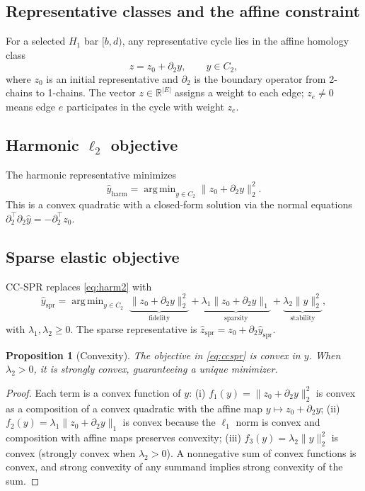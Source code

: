 \documentclass[11pt]{article}
\newtheorem{proposition}[theorem]{Proposition}
\DeclareMathOperator*{\argmin}{arg\,min}
\begin{document}
\subsection{Representative classes and the affine constraint}

For a selected $H_1$ bar $[b, d)$, any representative cycle lies in the affine homology class
\[
z = z_0 + \partial_2 y, \qquad y \in C_2,
\]
where $z_0$ is an initial representative and $\partial_2$ is the boundary operator from 2-chains to 1-chains.
The vector $z \in \mathbb{R}^{|E|}$ assigns a weight to each edge; $z_e \ne 0$ means edge $e$ participates in the cycle with weight $z_e$.

\subsection{Harmonic $\ell_2$ objective}

The harmonic representative minimizes
\begin{equation}\label{eq:harm2}
\hat{y}_{\mathrm{harm}} = \argmin_{y \in C_2} \| z_0 + \partial_2 y \|_2^2.
\end{equation}
This is a convex quadratic with a closed-form solution via the normal equations $\partial_2^\top \partial_2 \hat{y} = -\partial_2^\top z_0$.

\subsection{Sparse elastic objective}
\label{sec:sparse}

CC-SPR replaces \eqref{eq:harm2} with
\begin{equation}\label{eq:ccspr}
\hat{y}_{\mathrm{spr}} = \argmin_{y \in C_2} \;\underbrace{\| z_0 + \partial_2 y \|_2^2}_{\text{fidelity}} + \underbrace{\lambda_1 \| z_0 + \partial_2 y \|_1}_{\text{sparsity}} + \underbrace{\lambda_2 \| y \|_2^2}_{\text{stability}},
\end{equation}
with $\lambda_1, \lambda_2 \ge 0$.
The sparse representative is $\hat{z}_{\mathrm{spr}} = z_0 + \partial_2 \hat{y}_{\mathrm{spr}}$.

\begin{proposition}[Convexity]\label{prop:convex}
The objective in \eqref{eq:ccspr} is convex in $y$.
When $\lambda_2 > 0$, it is strongly convex, guaranteeing a unique minimizer.
\end{proposition}

\begin{proof}
Each term is a convex function of $y$:
(i) $f_1(y) = \|z_0 + \partial_2 y\|_2^2$ is convex as a composition of a convex quadratic with the affine map $y \mapsto z_0 + \partial_2 y$;
(ii) $f_2(y) = \lambda_1 \|z_0 + \partial_2 y\|_1$ is convex because the $\ell_1$ norm is convex and composition with affine maps preserves convexity;
(iii) $f_3(y) = \lambda_2 \|y\|_2^2$ is convex (strongly convex when $\lambda_2 > 0$).
A nonnegative sum of convex functions is convex, and strong convexity of any summand implies strong convexity of the sum.
\end{proof}
\end{document}
